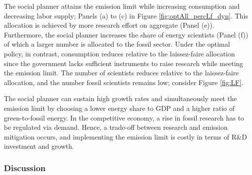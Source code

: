 \begin{figure}[h!!!]
\begin{subfigure}[]{0.4\textwidth}
\end{subfigure}

\end{figure} 
%
The social planner attains the emission limit while increasing consumption and decreasing labor supply; Panels (a) to (c) in Figure \ref{fig:optAll_percLf_dyn}. This allocation is achieved by more research effort on aggregate (Panel (e)). Furthermore, the social planner increases the share of energy scientists (Panel (f)) of which a larger number is allocated to the fossil sector. 
Under the optimal policy, in contrast, consumption reduces relative to the laissez-faire allocation since the government lacks sufficient instruments to raise research while meeting the emission limit. The number of scientists reduces relative to the laissez-faire allocation, and the number fossil scientists remains low; consider Figure \ref{fig:LF}.

The social planner can sustain  high growth rates and simultaneously meet the emission limit by choosing a lower energy share to GDP and a higher ratio of green-to-fossil energy. 
In the competitive economy, a rise in fossil research has to be regulated via demand. Hence, a trade-off between research and emission mitigation occurs, and implementing the emission limit is costly in terms of R\&D investment and growth. 


\subsubsection{Discussion}\label{subsec:dis}

